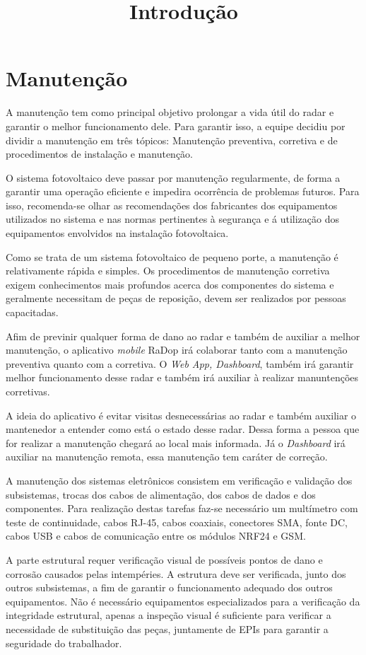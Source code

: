 
\chapter{Manutenção}

\title{Introdução}

A manutenção tem como principal objetivo prolongar a vida útil do radar e garantir o melhor funcionamento dele. Para garantir isso, a equipe decidiu por dividir a manutenção em três tópicos: Manutenção preventiva, corretiva e de procedimentos de instalação e manutenção.

O sistema fotovoltaico deve passar por manutenção regularmente, de forma a garantir uma operação eficiente e impedira ocorrência de problemas futuros. Para isso, recomenda-se olhar as recomendações dos fabricantes dos equipamentos utilizados no sistema e nas normas pertinentes à segurança e á utilização dos equipamentos envolvidos na instalação fotovoltaica.

Como se trata de um sistema fotovoltaico de pequeno porte, a manutenção é relativamente rápida e simples. Os procedimentos de manutenção corretiva exigem conhecimentos mais profundos acerca dos componentes do sistema e geralmente necessitam de peças de reposição, devem ser realizados por pessoas capacitadas.



Afim de previnir qualquer forma de dano ao radar e também de auxiliar a melhor manutenção, o aplicativo \textit{mobile} RaDop irá colaborar tanto com a manutenção preventiva quanto com a corretiva. O \textit{Web App, Dashboard}, também irá garantir melhor funcionamento desse radar e também irá auxiliar à realizar manuntenções corretivas.

A ideia do aplicativo é evitar visitas desnecessárias ao radar e também auxiliar o mantenedor a entender como está o estado desse radar. Dessa forma a pessoa que for realizar a manutenção chegará ao local mais informada. Já o \textit{Dashboard} irá auxiliar na manutenção remota, essa manutenção tem caráter de correção.

A manutenção dos sistemas eletrônicos consistem em verificação e validação dos subsistemas, trocas dos cabos de alimentação, dos cabos de dados e dos componentes. Para realização destas tarefas faz-se necessário um multímetro com teste de continuidade, cabos RJ-45, cabos coaxiais, conectores SMA, fonte DC, cabos USB e cabos de comunicação entre os módulos NRF24 e GSM.

A parte estrutural requer verificação visual de possíveis pontos de dano e corrosão causados pelas intempéries. A estrutura deve ser verificada, junto dos outros subsistemas, a fim de garantir o funcionamento adequado dos outros equipamentos. Não é necessário equipamentos especializados para a verificação da integridade estrutural, apenas a inspeção visual é suficiente para verificar a necessidade de substituição das peças, juntamente de EPIs para garantir a seguridade do trabalhador.

